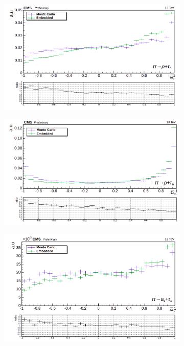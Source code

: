 \begin{figure}
\begin{subfigure}[b]{0.5\linewidth}
    \centering
    \includegraphics[width=\linewidth]{Chapitre6/Images/OptVar/omegabar_rho_rhotauh.png} 
    \caption*{} 
    \vspace{10mm}
  \end{subfigure}%
  \begin{subfigure}[b]{0.5\linewidth}
    \centering
    \includegraphics[width=\linewidth]{Chapitre6/Images/OptVar/Omegabar_rhotauh.png} 
    \caption*{} 
    \vspace{10mm}
  \end{subfigure}
      \begin{subfigure}[b]{0.5\linewidth}
    \centering
    \includegraphics[width=\linewidth]{Chapitre6/Images/OptVar/omegabar_a1_a1tauh.png} 

\end{subfigure}
\end{figure}
